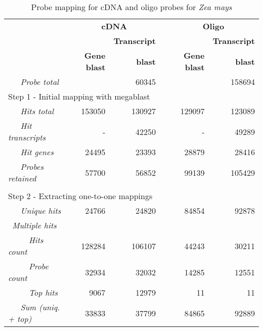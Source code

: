 \begin{table}[t]
	\centering
	\begin{threeparttable}
	\begin{footnotesize}
	\caption{Probe mapping for cDNA and oligo probes for \textit{Zea mays}}
	\label{tab:magic-probemap}
	\begin{tabular}{@{}p{3cm}r|rcr|r}
	\toprule

	& \multicolumn{2}{c}{\textbf{cDNA}} & \phantom{a} & 
	\multicolumn{2}{c}{\textbf{Oligo}} \\
	
	\cmidrule{2-3} \cmidrule{5-6}
	
	& & \textbf{Transcript}	&& & \textbf{Transcript} \\
	& \textbf{Gene blast} & \textbf{blast} && \textbf{Gene blast}	& 
	\textbf{blast} \\
	
	\midrule
	
	{\it ~~~Probe total\tnote{2}} & \multicolumn{2}{r}{60345} &&	
			\multicolumn{2}{r}{158694} \\[1.5ex]

		\multicolumn{6}{l}{Step 1 - Initial mapping with megablast} \\[.2ex]
	{\it ~~~Hits total\tnote{3}} & 153050 & 130927 && 129097 & 123089 \\
	{\it ~~~Hit transcripts\tnote{4}} & - & 42250 && - & 49289 \\
	{\it ~~~Hit genes\tnote{5}} & 24495 & 23393 && 28879 & 28416 \\
	{\it ~~~Probes retained} & 57700 & 56852 && 99139 & 105429 \\
	
	\multicolumn{6}{l}{}\\
		
		\multicolumn{6}{l}{Step 2 - Extracting one-to-one mappings} 
		\\[.2ex]
	{\it ~~~Unique hits\tnote{6}} & 24766 & 24820 && 84854 & 92878 \\
	\multicolumn{6}{l}{{\it ~Multiple hits}} \\
	{\it ~~~~~Hits count\tnote{3}} & 128284 & 106107 && 44243 & 30211 \\
	{\it ~~~~~Probe count} & 32934 & 32032 && 14285 & 12551 \\
	{\it ~~~~~Top hits} & 9067 & 12979 && 11 & 11 \\
	{\it ~~~Sum (uniq. + top)} & 33833 & 37799 && 84865 & 92889 \\
	

\end{tabular}
\end{footnotesize}
\end{threeparttable}
\end{table}
